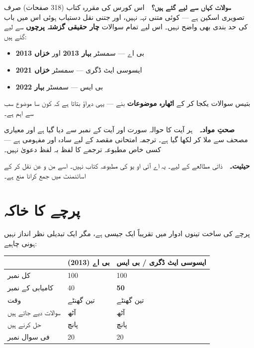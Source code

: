 \begin{tcolorbox}[enhanced, colback=white, colframe=bmblue, boxrule=0.6pt,
                  arc=3pt, left=12pt, right=12pt, top=10pt, bottom=10pt]
\textbf{\color{bmblue}سوالات کہاں سے لیے گئے ہیں؟}\ \
اس کورس کی مقررہ کتاب (\textenglish{318} صفحات) صرف تصویری اسکین ہے --- کوئی
متنی تہہ نہیں، اور جتنی نقل دستیاب ہوئی اس میں باب کی حد بندی بھی واضح نہیں۔
اس لیے تمام سوالات \textbf{چار حقیقی گزشتہ پرچوں} سے لیے گئے ہیں:

\smallskip
\begin{itemize}\setlength{\itemsep}{0pt}\setlength{\topsep}{2pt}
  \item بی اے --- سمسٹر \textbf{بہار \textenglish{2013}} اور \textbf{خزاں
        \textenglish{2013}}
  \item ایسوسی ایٹ ڈگری --- سمسٹر \textbf{خزاں \textenglish{2021}}
  \item بی ایس --- سمسٹر \textbf{بہار \textenglish{2022}}
\end{itemize}

\smallskip
بتیس سوالات یکجا کر کے \textbf{اٹھارہ موضوعات} بنے --- یہی دہراؤ بتاتا ہے کہ
کون سا موضوع سب سے اہم ہے۔

\medskip
\textbf{\color{bmblue}صحتِ مواد۔}\ \
ہر آیت کا حوالہ سورت اور آیت کے نمبر سے دیا گیا ہے اور معیاری مصحف سے ملا کر
لکھا گیا ہے۔ ترجمہ امتحانی مقصد کے لیے سادہ اور مفہومی ہے --- کسی خاص مطبوعہ
ترجمے کا لفظ بہ لفظ دعویٰ نہیں۔

\medskip
\textbf{\color{bmblue}حیثیت۔}\ \
ذاتی مطالعے کے لیے۔ یہ اے آئی او یو کی مطبوعہ کتاب نہیں۔ اسے من و عن نقل کر کے
اسائنمنٹ میں جمع کرانا منع ہے۔
\end{tcolorbox}

\clearpage

\section*{پرچے کا خاکہ}

پرچے کی ساخت تینوں ادوار میں تقریباً ایک جیسی ہے، مگر ایک تبدیلی نظر انداز
نہیں ہونی چاہیے:

\medskip
\begin{center}
\begin{tabular}{@{}p{4.6cm} p{4.4cm} p{5.0cm}@{}}
\toprule
 & \textbf{بی اے (\textenglish{2013})}
 & \textbf{ایسوسی ایٹ ڈگری / بی ایس} \\
\midrule
کل نمبر            & \textenglish{100} & \textenglish{100} \\
کامیابی کے نمبر     & \textenglish{40}  & \textbf{\textenglish{50}} \\
وقت                & تین گھنٹے          & تین گھنٹے \\
سوالات دیے جاتے ہیں & آٹھ               & آٹھ \\
حل کرنے ہیں         & پانچ              & پانچ \\
فی سوال نمبر        & \textenglish{20}  & \textenglish{20} \\
\bottomrule
\end{tabular}
\end{center}

